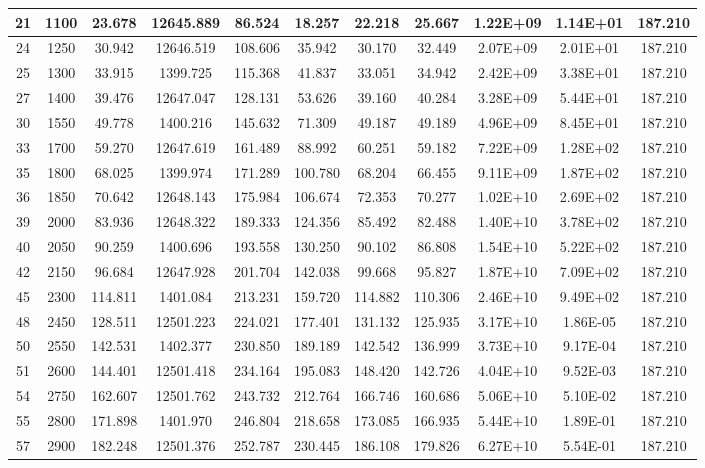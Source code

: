 \documentclass{article}
\begin{document}
\begin{center}
\begin{longtable}{|c|c|c|c|c|c|c|c|c|c|c|}
21	&	1100	&	23.678	&	12645.889	&	86.524	&	18.257	&	22.218	&	25.667	&	1.22E+09	&	1.14E+01	&	187.210	\\	\hline
24	&	1250	&	30.942	&	12646.519	&	108.606	&	35.942	&	30.170	&	32.449	&	2.07E+09	&	2.01E+01	&	187.210	\\	\hline
25	&	1300	&	33.915	&	1399.725	&	115.368	&	41.837	&	33.051	&	34.942	&	2.42E+09	&	3.38E+01	&	187.210	\\	\hline
27	&	1400	&	39.476	&	12647.047	&	128.131	&	53.626	&	39.160	&	40.284	&	3.28E+09	&	5.44E+01	&	187.210	\\	\hline
30	&	1550	&	49.778	&	1400.216	&	145.632	&	71.309	&	49.187	&	49.189	&	4.96E+09	&	8.45E+01	&	187.210	\\	\hline
33	&	1700	&	59.270	&	12647.619	&	161.489	&	88.992	&	60.251	&	59.182	&	7.22E+09	&	1.28E+02	&	187.210	\\	\hline
35	&	1800	&	68.025	&	1399.974	&	171.289	&	100.780	&	68.204	&	66.455	&	9.11E+09	&	1.87E+02	&	187.210	\\	\hline
36	&	1850	&	70.642	&	12648.143	&	175.984	&	106.674	&	72.353	&	70.277	&	1.02E+10	&	2.69E+02	&	187.210	\\	\hline
39	&	2000	&	83.936	&	12648.322	&	189.333	&	124.356	&	85.492	&	82.488	&	1.40E+10	&	3.78E+02	&	187.210	\\	\hline
40	&	2050	&	90.259	&	1400.696	&	193.558	&	130.250	&	90.102	&	86.808	&	1.54E+10	&	5.22E+02	&	187.210	\\	\hline
42	&	2150	&	96.684	&	12647.928	&	201.704	&	142.038	&	99.668	&	95.827	&	1.87E+10	&	7.09E+02	&	187.210	\\	\hline
45	&	2300	&	114.811	&	1401.084	&	213.231	&	159.720	&	114.882	&	110.306	&	2.46E+10	&	9.49E+02	&	187.210	\\	\hline
48	&	2450	&	128.511	&	12501.223	&	224.021	&	177.401	&	131.132	&	125.935	&	3.17E+10	&	1.86E-05	&	187.210	\\	\hline
50	&	2550	&	142.531	&	1402.377	&	230.850	&	189.189	&	142.542	&	136.999	&	3.73E+10	&	9.17E-04	&	187.210	\\	\hline
51	&	2600	&	144.401	&	12501.418	&	234.164	&	195.083	&	148.420	&	142.726	&	4.04E+10	&	9.52E-03	&	187.210	\\	\hline
54	&	2750	&	162.607	&	12501.762	&	243.732	&	212.764	&	166.746	&	160.686	&	5.06E+10	&	5.10E-02	&	187.210	\\	\hline
55	&	2800	&	171.898	&	1401.970	&	246.804	&	218.658	&	173.085	&	166.935	&	5.44E+10	&	1.89E-01	&	187.210	\\	\hline
57	&	2900	&	182.248	&	12501.376	&	252.787	&	230.445	&	186.108	&	179.826	&	6.27E+10	&	5.54E-01	&	187.210	\\	\hline

\end{longtable}
\end{center}
\end{document}
